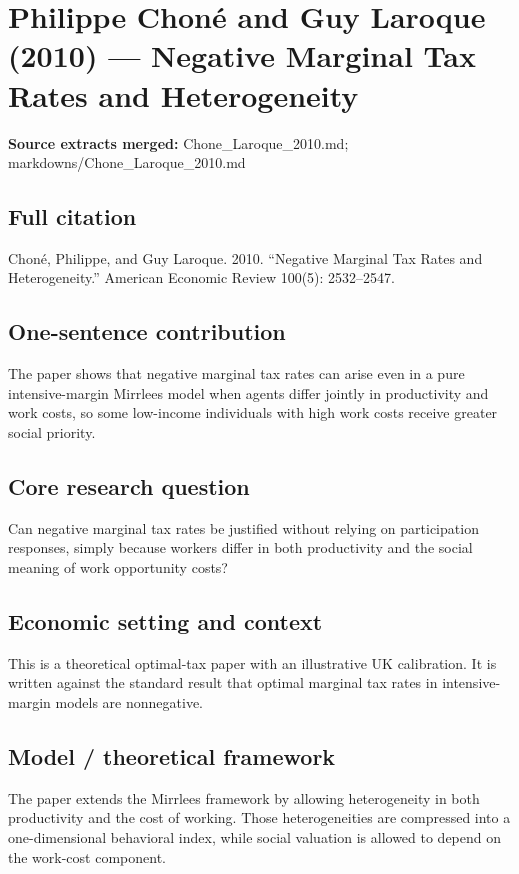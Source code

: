 \documentclass[11pt,a4paper]{article}
\begin{document}
\section*{Philippe Choné and Guy Laroque (2010) — Negative Marginal Tax Rates and Heterogeneity}

\textbf{Source extracts merged:} Chone\_Laroque\_2010.md; markdowns/Chone\_Laroque\_2010.md

\subsection*{Full citation}
Choné, Philippe, and Guy Laroque. 2010. “Negative Marginal Tax Rates and Heterogeneity.” American Economic Review 100(5): 2532–2547.

\subsection*{One-sentence contribution}
The paper shows that negative marginal tax rates can arise even in a pure intensive-margin Mirrlees model when agents differ jointly in productivity and work costs, so some low-income individuals with high work costs receive greater social priority.

\subsection*{Core research question}
Can negative marginal tax rates be justified without relying on participation responses, simply because workers differ in both productivity and the social meaning of work opportunity costs?

\subsection*{Economic setting and context}
This is a theoretical optimal-tax paper with an illustrative UK calibration. It is written against the standard result that optimal marginal tax rates in intensive-margin models are nonnegative.

\subsection*{Model / theoretical framework}
The paper extends the Mirrlees framework by allowing heterogeneity in both productivity and the cost of working. Those heterogeneities are compressed into a one-dimensional behavioral index, while social valuation is allowed to depend on the work-cost component.
\end{document}
